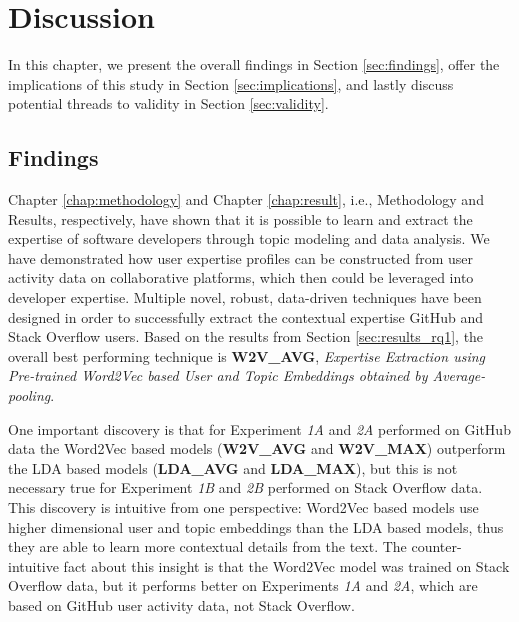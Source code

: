 \chapter{Discussion\label{chap:discussion}}

    In this chapter, we present the overall findings in Section \ref{sec:findings}, offer the implications of this study in Section \ref{sec:implications}, and lastly discuss potential threads to validity in Section \ref{sec:validity}.
    
    \section{Findings\label{sec:findings}}
        Chapter \ref{chap:methodology} and Chapter \ref{chap:result}, i.e., Methodology and Results, respectively, have shown that it is possible to learn and extract the expertise of software developers through topic modeling and data analysis. We have demonstrated how user expertise profiles can be constructed from user activity data on collaborative platforms, which then could be leveraged into developer expertise. Multiple novel, robust, data-driven techniques have been designed in order to successfully extract the contextual expertise GitHub and Stack Overflow users. Based on the results from Section \ref{sec:results_rq1}, the overall best performing technique is \textbf{W2V\_AVG}, \emph{Expertise Extraction using Pre-trained Word2Vec based User and Topic Embeddings obtained by Average-pooling}. 
        
        One important discovery is that for Experiment \emph{1A} and \emph{2A} performed on GitHub data the Word2Vec based models (\textbf{W2V\_AVG} and \textbf{W2V\_MAX}) outperform the LDA based models (\textbf{LDA\_AVG} and \textbf{LDA\_MAX}), but this is not necessary true for Experiment \emph{1B} and \emph{2B} performed on Stack Overflow data. This discovery is intuitive from one perspective: Word2Vec based models use higher dimensional user and topic embeddings than the LDA based models, thus they are able to learn more contextual details from the text. The counter-intuitive fact about this insight is that the Word2Vec model was trained on Stack Overflow data, but it performs better on Experiments \emph{1A} and \emph{2A}, which are based on GitHub user activity data, not Stack Overflow. 
        
